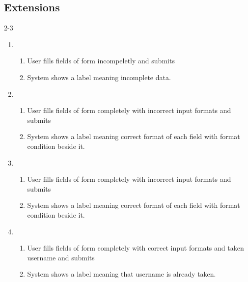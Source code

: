\documentclass[11pt]{article}
\begin{document}
\subsection{Extensions}
2-3
\begin{enumerate}[label=(\alph*)]
\item
\begin{enumerate}[label=(\arabic*)]
\item
User fills fields of form incompeletly and submits
\item
System shows a label meaning incomplete data.
\end{enumerate}

\item
\begin{enumerate}[label=(\arabic*)]
\item
User fills fields of form completely with incorrect input formats and submits
\item
System shows a label meaning correct format of each field with format condition beside it.
\end{enumerate}

\item
\begin{enumerate}[label=(\arabic*)]
\item
User fills fields of form completely with incorrect input formats and submits
\item
System shows a label meaning correct format of each field with format condition beside it.
\end{enumerate}

\item
\begin{enumerate}[label=(\arabic*)]
\item
User fills fields of form completely with correct input formats and taken username and submits
\item
System shows a label meaning that username is already taken.
\end{enumerate}
\end{enumerate}
\end{document}
